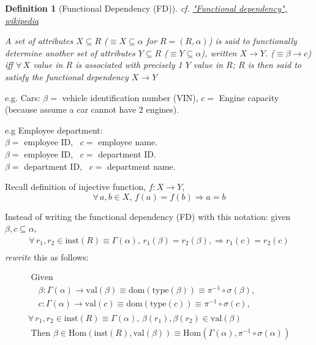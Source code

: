 \documentclass[10pt]{amsart}
\newtheorem{definition}{Definition}
\begin{document}
\begin{multicols*}{2}
\begin{definition}[Functional Dependency (FD)]
	cf. \href{https://en.wikipedia.org/wiki/Functional_dependency}{"Functional dependency", wikipedia}
	
	A set of attributes $X \subseteq R$ ($\equiv X \subseteq \alpha$ for $R = (R,\alpha)$) is said to functionally determine another set of attributes $Y \subseteq R$ ($\equiv Y \subseteq \alpha$), written $X\to Y$. ($\equiv \beta \to c$) \\
	iff $\forall \, X$ value in $R$ is associated with precisely 1 $Y$ value in $R$; $R$ is then said to satisfy the functional dependency $X\to Y$
\end{definition}

e.g. Cars: $\beta = $ vehicle identification number (VIN), $c=$ Engine capacity (because assume a car cannot have 2 engines).

e.g Employee department: \\
$\beta = $ employee ID, \qquad \, $c = $ employee name. \\
$\beta = $ employee ID, \qquad \, $c = $ department ID. \\
$\beta = $ department ID, \qquad \, $c = $ department name.

Recall definition of injective function, $f:X \to Y$,
\[
\forall \, a,b \in X, \, f(a) = f(b) \Longrightarrow a =b
\]

Instead of writing the functional dependency (FD) with this notation: given $\beta, c \subseteq \alpha$, 
\[
\begin{gathered} 
\forall \, r_1, r_2 \in \text{inst}(R) \equiv \Gamma(\alpha), \, r_1(\beta) = r_2(\beta), \Longrightarrow r_1(c) = r_2(c) \\
\end{gathered} 
\]
\emph{rewrite} this as follows:

\begin{equation}
\begin{gathered} 
	\text{ Given } \\
	\begin{aligned} 
	& \beta : \Gamma(\alpha) \to \text{val}(\beta) \equiv \text{dom}(\text{type}(\beta)) \equiv \pi^{-1} \circ \sigma(\beta), \, \\
	& c : \Gamma(\alpha) \to \text{val}(c) \equiv \text{dom}(\text{type}(c)) \equiv \pi^{-1} \circ \sigma(c), \end{aligned} \\
\forall \, r_1, r_2 \in \text{inst}(R) \equiv \Gamma(\alpha), \, \beta(r_1), \beta(r_2) \in \text{val}(\beta)  \\
\text{ Then } \beta \in \text{Hom}(\text{inst}(R), \text{val}(\beta)) \equiv \text{Hom}(\Gamma(\alpha), \pi^{-1}\circ \sigma(\alpha))
\end{gathered} 
\end{equation}


\end{multicols*}
\end{document}
